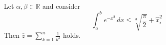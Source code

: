 \documentclass{article}
\begin{document}
Let $\alpha,\beta\in\mathbb{R}$ and consider
\[ \int_{a}^{b} e^{-x^2}\,dx \le \sqrt[3]{\frac{\pi}{2}} + \hat{x}_i^{2} \]
Then $\bar{z} = \sum_{k=1}^{n} \frac{1}{k^2}$ holds.
\end{document}
